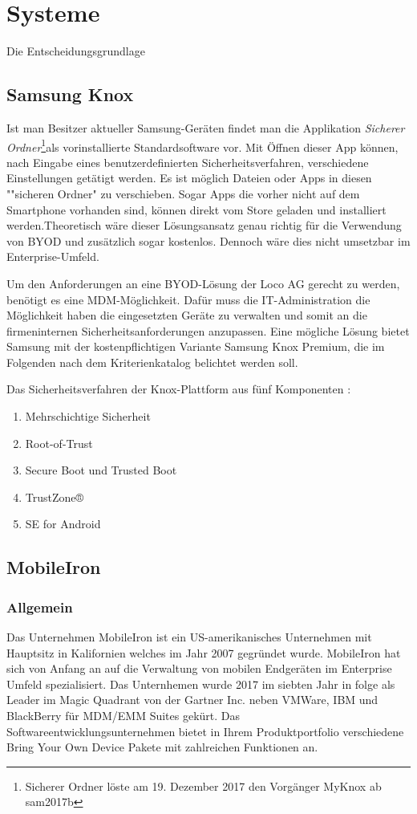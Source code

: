 \chapter{Systeme}
\label{cha:systeme}
Die Entscheidungsgrundlage 
\section{Samsung Knox}


Ist man Besitzer aktueller Samsung-Geräten findet man die Applikation \textit{Sicherer Ordner}\footnote{Sicherer Ordner löste am 19. Dezember 2017 den Vorgänger MyKnox ab {sam2017b} }als vorinstallierte Standardsoftware vor. Mit Öffnen dieser App können, nach Eingabe eines benutzerdefinierten Sicherheitsverfahren, verschiedene Einstellungen getätigt werden. Es ist möglich Dateien oder Apps in diesen ""sicheren Ordner" zu verschieben. Sogar Apps die vorher nicht auf dem Smartphone vorhanden sind, können direkt vom Store geladen und installiert werden.Theoretisch wäre dieser Lösungsansatz genau richtig für die Verwendung von BYOD und zusätzlich sogar kostenlos. Dennoch wäre dies nicht umsetzbar im Enterprise-Umfeld.

Um den Anforderungen an eine BYOD-Lösung der Loco AG gerecht zu werden, benötigt es eine MDM-Möglichkeit. Dafür muss die IT-Administration die Möglichkeit haben die eingesetzten Geräte zu verwalten und somit an die firmeninternen Sicherheitsanforderungen anzupassen. Eine mögliche Lösung bietet Samsung mit der kostenpflichtigen Variante Samsung Knox Premium, die im Folgenden nach dem Kriterienkatalog belichtet werden soll.


Das Sicherheitsverfahren der Knox-Plattform aus fünf Komponenten \cite{sam2017}:
\begin{enumerate}
\item Mehrschichtige Sicherheit
\item Root-of-Trust
\item Secure Boot und Trusted Boot
\item TrustZone®
\item SE for Android
\end{enumerate}

\newpage


\section{MobileIron}

\subsection {Allgemein} 
Das Unternehmen MobileIron ist ein US-amerikanisches Unternehmen mit Hauptsitz in Kalifornien welches im Jahr 2007 gegründet wurde. MobileIron hat sich von Anfang an auf die Verwaltung von mobilen Endgeräten im Enterprise Umfeld spezialisiert. Das Unternhemen wurde 2017 im siebten Jahr in folge als Leader im Magic Quadrant von der Gartner Inc. neben VMWare, IBM und BlackBerry für MDM/EMM Suites gekürt. Das Softwareentwicklungsunternehmen bietet in Ihrem Produktportfolio verschiedene Bring Your Own Device Pakete mit zahlreichen Funktionen an. 
